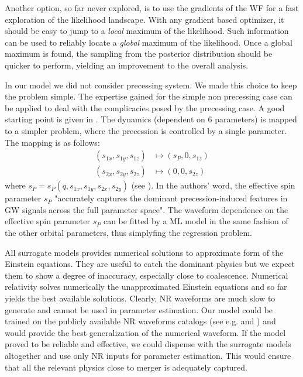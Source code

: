 \par
Another option, so far never explored, is to use the gradients of the WF for a fast exploration of the likelihood landscape. With any gradient based optimizer, it should be easy to jump to a \textit{local} maximum of the likelihood. Such information can be used to reliably locate a \textit{global} maximum of the likelihood. Once a global maximum is found, the sampling from the posterior distribution should be quicker to perform, yielding an improvement to the overall analysis.
\par
In our model we did not consider precessing system. We made this choice to keep the problem simple.
The expertise gained for the simple non precessing case can be applied to deal with the complicacies posed by the precessing case.
A good starting point is given in \cite{Schmidt2015Precession}. The dynamics (dependent on 6 parameters) is mapped to a simpler problem, where the precession is controlled by a single parameter. The mapping is as follows:
\begin{align*}
	(s_{1x},s_{1y}, s_{1z}) &\longmapsto (s_{P},0, s_{1z})\\
	(s_{2x},s_{2y}, s_{2z}) &\longmapsto (0, 0, s_{2z})
\end{align*}
where $s_P = s_P(q,s_{1x},s_{1y}, s_{2x},s_{2y})$ (see \cite[eq. 3]{Schmidt2015Precession}).
In the authors' word, the effective spin parameter $s_{P}$ "accurately captures the dominant precession-induced features in GW signals across the full parameter space".
The waveform dependence on the effective spin parameter $s_P$ can be fitted by a ML model in the same fashion of the other orbital parameters, thus simplyfing the regression problem.
\par
All surrogate models provides numerical solutions to approximate form of the Einstein equations. They are useful to catch the dominant physics but we expect them to show a degree of inaccuracy, especially close to coalescence.
Numerical relativity solves numerically the unapproximated Einstein equations and so far yields the best available solutions.
Clearly, NR waveforms are much slow to generate and cannot be used in parameter estimation.
Our model could be trained on the publicly available NR waveforms catalogs (see e.g. \cite{Mroue2013NRWFcatalog} and \cite{Healy2017NRWFcatalog}) and would provide the best generalization of the numerical waveform.
If the model proved to be reliable and effective, we could dispense with the surrogate models altogether and use only NR inputs for parameter estimation. This would ensure that all the relevant physics close to merger is adequately captured.
